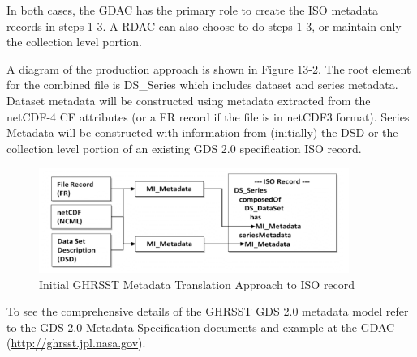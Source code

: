 In both cases, the GDAC has the primary role to create the ISO metadata records in steps 1-3. A
RDAC can also choose to do steps 1-3, or maintain only the collection level portion.
\newp

A diagram of the production approach is shown in Figure 13-2. The root element for the combined file
is DS\_Series which includes dataset and series metadata. Dataset metadata will be constructed
using metadata extracted from the netCDF-4 CF attributes (or a FR record if the file is in netCDF3
format). Series Metadata will be constructed with information from (initially) the DSD or the collection
level portion of an existing GDS 2.0 specification ISO record.
\newp 

\begin{figure}[H]
\centering
\includegraphics[width=0.9\textwidth]{../images/ghrsst_metadata_translation.png}
\caption{Initial GHRSST Metadata Translation Approach to ISO record}
\label{fig:GHRSST_metadata_translation}
\end{figure}

To see the comprehensive details of the GHRSST GDS 2.0 metadata model refer to the GDS 2.0
Metadata Specification documents and example at the GDAC (\url{http://ghrsst.jpl.nasa.gov}).